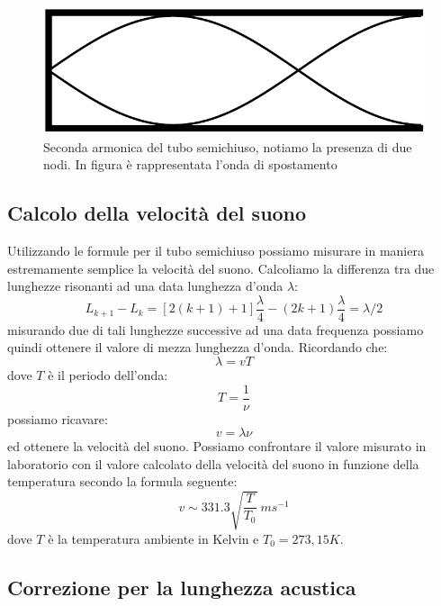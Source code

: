 \documentclass[a4paper,10pt,oneside]{article}
\begin{document}
\begin{figure}[H]
 \centering
 \includegraphics[width=\textwidth]{../Immagini/chiuso_2.png}
 \caption{Seconda armonica del tubo semichiuso, notiamo la presenza di due nodi. In figura è rappresentata l'onda di spostamento}
 \label{fig:chiuso_seconda}
\end{figure}


\subsection*{Calcolo della velocità del suono}
Utilizzando le formule per il tubo semichiuso possiamo misurare in maniera estremamente semplice la velocità del suono. Calcoliamo la differenza tra due lunghezze risonanti ad una data lunghezza d'onda $\lambda$:
\begin{equation}
 L_{k+1}-L_k=[2(k+1)+1]\frac{\lambda}{4}-(2k+1)\frac{\lambda}{4}=\lambda/2
\end{equation}
misurando due di tali lunghezze successive ad una data frequenza possiamo quindi ottenere il valore di mezza lunghezza d'onda.
Ricordando che:
\begin{equation}
 \lambda=vT
\end{equation}
dove $T$ è il periodo dell'onda:
\begin{equation}
 T=\frac{1}{\nu}
\end{equation}
possiamo ricavare:
\begin{equation}
 v=\lambda\nu
\end{equation}
ed ottenere la velocità del suono. Possiamo confrontare il valore misurato in laboratorio con il valore calcolato della velocità del suono in funzione della temperatura secondo la formula seguente:
\begin{equation}\label{sound_speed}
 v\sim 331.3\sqrt{\frac{T}{T_0}}\ ms^{-1}
\end{equation}
dove $T$ è la temperatura ambiente in Kelvin e $T_0=273,15K$.
 

\subsection*{Correzione per la lunghezza acustica}
\end{document}
